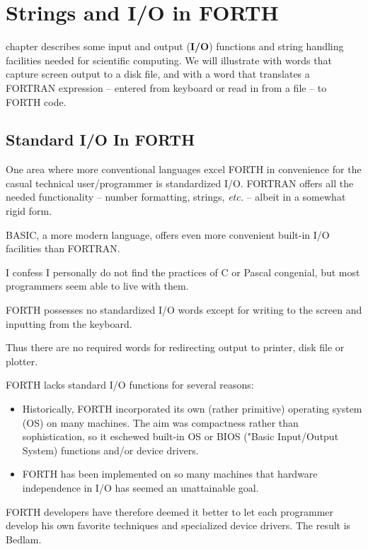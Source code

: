 \chapter{Strings and I/O in FORTH}
\startcontents[chapters]

 chapter describes some input and output (\textbf{I/O}) functions and string handling facilities needed for scientific computing.
We will illustrate with words that capture screen output to a disk file, and with a word that translates a FORTRAN expression -- entered from keyboard or read in from a file -- to FORTH code.

\section{Standard I/O In FORTH}

One area where more conventional languages excel FORTH in convenience for the casual technical user/programmer is standardized I/O.
FORTRAN offers all the needed functionality -- number formatting, strings, \textit{etc.} -- albeit in a somewhat rigid form.

BASIC, a more modern language, offers even more convenient built-in I/O facilities than FORTRAN.

I confess I personally do not find the practices of C or Pascal congenial, but most programmers seem able to live with them.

FORTH possesses no standardized I/O words except for writing to the screen and inputting from the keyboard.

Thus there are no required words for redirecting output to printer, disk file or plotter.

FORTH lacks standard I/O functions for several reasons:

\begin{itemize}
\item Historically, FORTH incorporated its own (rather primitive) operating system (OS) on many machines.
  The aim was compactness rather than sophistication, so it eschewed built-in OS or BIOS ("Basic Input/Output System) functions and/or device drivers.
\item FORTH has been implemented on so many machines that hardware independence in I/O has seemed an unattainable goal.
\end{itemize}

FORTH developers have therefore deemed it better to let each programmer develop his own favorite techniques and specialized device drivers.
The result is Bedlam.

